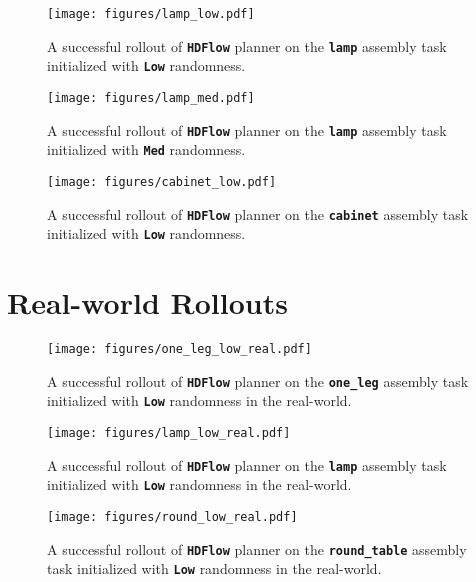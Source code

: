\documentclass{article} %
\begin{document}
\begin{figure}[htp]
    \centering
    \texttt{[image: figures/lamp\_low.pdf]}
    \caption{A successful rollout of \texttt{\textbf{HDFlow}} planner on the \texttt{\textbf{lamp}} assembly task initialized with \texttt{\textbf{Low}} randomness.}
    \label{fig:lamp_low_rollout}
\end{figure}

\begin{figure}[htp]
    \centering
    \texttt{[image: figures/lamp\_med.pdf]}
    \caption{A successful rollout of \texttt{\textbf{HDFlow}} planner on the \texttt{\textbf{lamp}} assembly task initialized with \texttt{\textbf{Med}} randomness.}
    \label{fig:lamp_med_rollout}
\end{figure}

\begin{figure}[htp]
    \centering
    \texttt{[image: figures/cabinet\_low.pdf]}
    \caption{A successful rollout of \texttt{\textbf{HDFlow}} planner on the \texttt{\textbf{cabinet}} assembly task initialized with \texttt{\textbf{Low}} randomness.}
    \label{fig:cabinet_low_rollout}
\end{figure}

\newpage
\section{Real-world Rollouts}

\begin{figure}[htp]
    \centering
    \texttt{[image: figures/one\_leg\_low\_real.pdf]}
    \caption{\small A successful rollout of \texttt{\textbf{HDFlow}} planner on the \texttt{\textbf{one\_leg}} assembly task initialized with \texttt{\textbf{Low}} randomness in the real-world.}
    \label{fig:one_leg_low_real_rollout}
\end{figure}

\begin{figure}[htp]
    \centering
    \texttt{[image: figures/lamp\_low\_real.pdf]}
    \caption{A successful rollout of \texttt{\textbf{HDFlow}} planner on the \texttt{\textbf{lamp}} assembly task initialized with \texttt{\textbf{Low}} randomness in the real-world.}
    \label{fig:lamp_low_real_rollout}
\end{figure}

\begin{figure}[htp]
    \centering
    \texttt{[image: figures/round\_low\_real.pdf]}
    \caption{A successful rollout of \texttt{\textbf{HDFlow}} planner on the \texttt{\textbf{round\_table}} assembly task initialized with \texttt{\textbf{Low}} randomness in the real-world.}
    \label{fig:round_low_real_rollout}
\end{figure}
\end{document}
